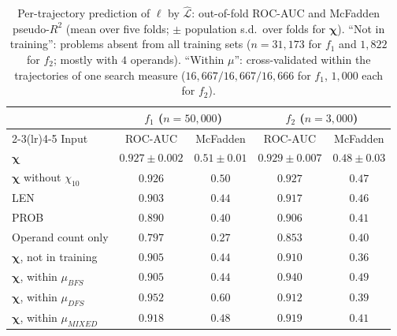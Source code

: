 \begin{table}[h]
\centering\small
\caption{Per-trajectory prediction of $\ell$ by $\hat{\mathcal{L}}$: out-of-fold ROC-AUC and McFadden pseudo-$R^2$ (mean over five folds; $\pm$ population s.d.\ over folds for $\boldsymbol{\chi}$). ``Not in training'': problems absent from all training sets ($n=31{,}173$ for $f_1$ and $1{,}822$ for $f_2$; mostly with $4$ operands). ``Within $\mu$'': cross-validated within the trajectories of one search measure ($16{,}667/16{,}667/16{,}666$ for $f_1$, $1{,}000$ each for $f_2$).}
\label{tab:gbc}
\begin{tabular}{lcccc}
\toprule
 & \multicolumn{2}{c}{$f_1$ ($n=50{,}000$)} & \multicolumn{2}{c}{$f_2$ ($n=3{,}000$)} \\
\cmidrule(lr){2-3}\cmidrule(lr){4-5}
Input & ROC-AUC & McFadden & ROC-AUC & McFadden \\
\midrule
$\boldsymbol{\chi}$ & $0.927\pm0.002$ & $0.51\pm0.01$ & $0.929\pm0.007$ & $0.48\pm0.03$ \\
$\boldsymbol{\chi}$ without $\chi_{10}$ & $0.926$ & $0.50$ & $0.927$ & $0.47$ \\
LEN & $0.903$ & $0.44$ & $0.917$ & $0.46$ \\
PROB & $0.890$ & $0.40$ & $0.906$ & $0.41$ \\
Operand count only & $0.797$ & $0.27$ & $0.853$ & $0.40$ \\
\midrule
$\boldsymbol{\chi}$, not in training & $0.905$ & $0.44$ & $0.910$ & $0.36$ \\
$\boldsymbol{\chi}$, within $\mu_{BFS}$ & $0.905$ & $0.44$ & $0.940$ & $0.49$ \\
$\boldsymbol{\chi}$, within $\mu_{DFS}$ & $0.952$ & $0.60$ & $0.912$ & $0.39$ \\
$\boldsymbol{\chi}$, within $\mu_{MIXED}$ & $0.918$ & $0.48$ & $0.919$ & $0.41$ \\
\bottomrule
\end{tabular}
\end{table}

